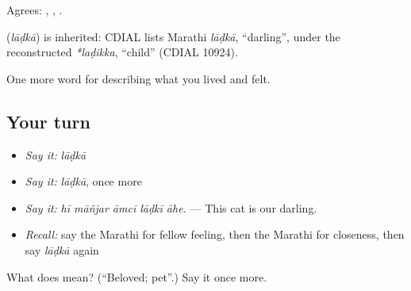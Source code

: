 Agrees:  ,  ,  .

\begin{cousinweb}
\textbf{} (\emph{lāḍkā}) is inherited: CDIAL lists Marathi \emph{lāḍkā}, \textquotedblleft{}darling\textquotedblright{}, under the reconstructed \emph{*laḍikka}, \textquotedblleft{}child\textquotedblright{} (CDIAL 10924).
\end{cousinweb}

\begin{grammarlens}[title={What you've built}]
One more word for describing what you lived and felt.
\end{grammarlens}

\subsection*{Your turn}
\begin{itemize}
\raggedright
  \item \emph{Say it:} \emph{lāḍkā}
  \item \emph{Say it:} \emph{lāḍkā}, once more
  \item \emph{Say it:} \emph{hī māñjar āmcī lāḍkī āhe.} — This cat is our darling.
  \item \emph{Recall:} say the Marathi for fellow feeling, then the Marathi for closeness, then say \emph{lāḍkā} again
\end{itemize}

\begin{tcolorbox}[breakable,colback=teal!4,colframe=teal!35!black,title={Before you move on}]
What does  mean? (\textquotedblleft{}Beloved; pet\textquotedblright{}.) Say it once more.
\end{tcolorbox}
